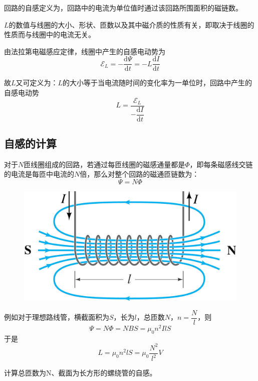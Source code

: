 \documentclass[
	12pt, %
	a4paper, %
]{myLegrandOrangeBook}
\newcommand{\rmd}{\mathrm{d}}
\newcommand{\deriv}[2]{\frac{\rmd #1}{\rmd #2}}
\newcommand{\dderiv}[2]{\dfrac{\rmd #1}{\rmd #2}}
\begin{document}
\begin{definition}[回路的自感]
    回路的自感定义为，回路中的电流为单位值时通过该回路所围面积的磁链数。
\end{definition}

\(L\)的数值与线圈的大小、形状、匝数以及其中磁介质的性质有关，即取决于线圈的性质而与线圈中的电流无关。

由法拉第电磁感应定律，线圈中产生的自感电动势为
\begin{equation}
    \mathscr{E}_L = -\deriv{\varPsi}{t} = - L \deriv{I}{t}
\end{equation}

故\(L\)又可定义为：\(L\)的大小等于当电流随时间的变化率为一单位时，回路中产生的自感电动势
\begin{equation}
    L = \frac{\mathscr{E}_L}{-\dderiv{I}{t}}
\end{equation}

\subsection{自感的计算}

对于\(N\)匝线圈组成的回路，若通过每匝线圈的磁感通量都是\(\varPhi\)，即每条磁感线交链的电流是每匝中电流的\(N\)倍，那么对整个回路的磁通匝链数为：
\begin{equation}
    \varPsi = N \varPhi
\end{equation}

\begin{figure}[!h]
    \centering
    \includegraphics[width = .3\textwidth]{graphics/自感系数的计算.png}
\end{figure}

例如对于理想路线管，横截面积为\(S\)，长为\(l\)，总匝数\(N\)，\(n = \dfrac{N}{l}\)，则
\begin{equation}
    \varPsi = N \varPhi = NBS = \mu_0 n^2 I l S
\end{equation}
于是
\begin{equation}
    L = \mu_0 n^2 l S = \mu_0 \frac{N^2}{l^2} V
\end{equation}

\begin{exercise}
计算总匝数为N、截面为长方形的螺绕管的自感。
\end{exercise}
\end{document}

